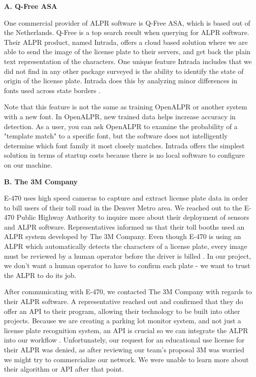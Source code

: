 \documentclass[11pt, oneside, fullpage, doublespace]{article}
\begin{document}
\textbf{A. Q-Free ASA}

One commercial provider of ALPR software is Q-Free ASA, which is based out of the Netherlands. Q-Free is a top search result when querying for ALPR software. Their ALPR product, named Intrada, offers a cloud based solution where we are able to send the image of the license plate to their servers, and get back the plain text representation of the characters. One unique feature Intrada includes that we did not find in any other package surveyed is the ability to identify the state of origin of the license plate. Intrada does this by analyzing minor differences in fonts used across state borders \cite{intrada2014}.

Note that this feature is not the same as training OpenALPR or another system with a new font. In OpenALPR, new trained data helps increase accuracy in detection. As a user, you can ask OpenALPR to examine the probability of a "template match" to a specific font, but the software does not intelligently determine which font family it most closely matches. Intrada offers the simplest solution in terms of startup costs because there is no local software to configure on our machine.

\textbf{B. The 3M Company}

E-470 uses high speed cameras to capture and extract license plate data in order to bill users of their toll road in the Denver Metro area. We reached out to the E-470 Public Highway Authority to inquire more about their deployment of sensors and ALPR software. Representatives informed us that their toll booths used an ALPR system developed by The 3M Company. Even though E-470 is using an ALPR which automatically detects the characters of a license plate, every image must be reviewed by a human operator before the driver is billed \cite{e470}. In our project, we don't want a human operator to have to confirm each plate - we want to trust the ALPR to do its job.

After communicating with E-470, we contacted The 3M Company with regards to their ALPR software. A representative reached out and confirmed that they do offer an API to their program, allowing their technology to be built into other projects. Because we are creating a parking lot monitor system, and not just a license plate recognition system, an API is crucial so we can integrate the ALPR into our workflow \cite{mmmalpr}. Unfortunately, our request for an educational use license for their ALPR was denied, as after reviewing our team's proposal 3M was worried we might try to commercialize our network. We were unable to learn more about their algorithm or API after that point.
\end{document}
